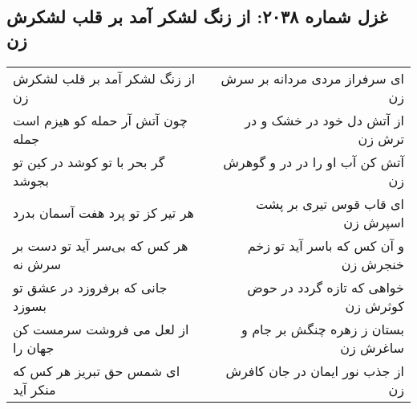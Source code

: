 \begin{center}
\section*{غزل شماره ۲۰۳۸: از زنگ لشکر آمد بر قلب لشکرش زن}
\label{sec:2038}
\begin{longtable}{l p{0.5cm} r}
از زنگ لشکر آمد بر قلب لشکرش زن
&&
ای سرفراز مردی مردانه بر سرش زن
\\
چون آتش آر حمله کو هیزم است جمله
&&
از آتش دل خود در خشک و در ترش زن
\\
گر بحر با تو کوشد در کین تو بجوشد
&&
آتش کن آب او را در در و گوهرش زن
\\
هر تیر کز تو پرد هفت آسمان بدرد
&&
ای قاب قوس تیری بر پشت اسپرش زن
\\
هر کس که بی‌سر آید تو دست بر سرش نه
&&
و آن کس که باسر آید تو زخم خنجرش زن
\\
جانی که برفروزد در عشق تو بسوزد
&&
خواهی که تازه گردد در حوض کوثرش زن
\\
از لعل می فروشت سرمست کن جهان را
&&
بستان ز زهره چنگش بر جام و ساغرش زن
\\
ای شمس حق تبریز هر کس که منکر آید
&&
از جذب نور ایمان در جان کافرش زن
\\
\end{longtable}
\end{center}
